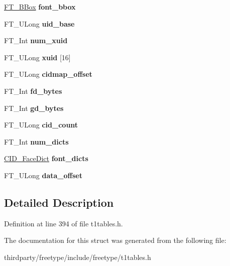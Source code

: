 \begin{DoxyCompactItemize}
\hyperlink{struct_f_t___b_box__}{F\+T\+\_\+\+B\+Box} {\bfseries font\+\_\+bbox}
\item 
\mbox{\label{struct_c_i_d___face_info_rec___a1fae2d9b863a9e27089894789ab4413e}} 
F\+T\+\_\+\+U\+Long {\bfseries uid\+\_\+base}
\item 
\mbox{\label{struct_c_i_d___face_info_rec___ab7dc17fbfc7926996832513266e88623}} 
F\+T\+\_\+\+Int {\bfseries num\+\_\+xuid}
\item 
\mbox{\label{struct_c_i_d___face_info_rec___a32cd8836dd8a395d9aa6fb5831f06b27}} 
F\+T\+\_\+\+U\+Long {\bfseries xuid} \mbox{[}16\mbox{]}
\item 
\mbox{\label{struct_c_i_d___face_info_rec___a8c72c1a90704c7e3519ca182613fec5a}} 
F\+T\+\_\+\+U\+Long {\bfseries cidmap\+\_\+offset}
\item 
\mbox{\label{struct_c_i_d___face_info_rec___a72944c0b4e85dba619adaf114ff7a8b1}} 
F\+T\+\_\+\+Int {\bfseries fd\+\_\+bytes}
\item 
\mbox{\label{struct_c_i_d___face_info_rec___a4f1caffd756d0daebbc69af0dcdd74a0}} 
F\+T\+\_\+\+Int {\bfseries gd\+\_\+bytes}
\item 
\mbox{\label{struct_c_i_d___face_info_rec___a5eae3fdfaded7bdef4e0bd027ecba595}} 
F\+T\+\_\+\+U\+Long {\bfseries cid\+\_\+count}
\item 
\mbox{\label{struct_c_i_d___face_info_rec___a3b53b4e162a3c1434c6b91334aa69041}} 
F\+T\+\_\+\+Int {\bfseries num\+\_\+dicts}
\item 
\mbox{\label{struct_c_i_d___face_info_rec___a821a773b846c837338d1c03984e5e7d5}} 
\hyperlink{struct_c_i_d___face_dict_rec__}{C\+I\+D\+\_\+\+Face\+Dict} {\bfseries font\+\_\+dicts}
\item 
\mbox{\label{struct_c_i_d___face_info_rec___a31e8fb9ac2b0c1fa63220e5e07aeea97}} 
F\+T\+\_\+\+U\+Long {\bfseries data\+\_\+offset}
\end{DoxyCompactItemize}


\subsection{Detailed Description}


Definition at line 394 of file t1tables.\+h.



The documentation for this struct was generated from the following file\+:\begin{DoxyCompactItemize}
\item 
thirdparty/freetype/include/freetype/t1tables.\+h\end{DoxyCompactItemize}
